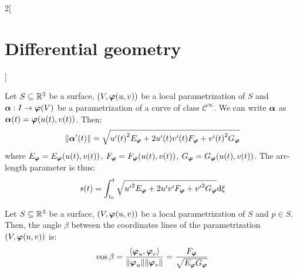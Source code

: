\documentclass[../../../main.tex]{subfiles}
\begin{document}
\begin{multicols}{2}[\section{Differential geometry}]
  \begin{proposition}
    Let $S\subseteq\mathbb{R}^3$ be a surface, $(V,\boldsymbol{\mathrm{\varphi}}(u,v))$ be a local parametrization of $S$ and $\boldsymbol{\mathrm{\alpha}}:I\rightarrow\boldsymbol{\mathrm{\varphi}}(V)$ be a parametrization of a curve of class $\mathcal{C}^\infty$. We can write $\boldsymbol{\mathrm{\alpha}}$ as $\boldsymbol{\mathrm{\alpha}}(t)=\boldsymbol{\mathrm{\varphi}}(u(t),v(t))$. Then:
    $$\|\boldsymbol{\mathrm{\alpha}}'(t)\|=\sqrt{{u'(t)}^2 E_{\boldsymbol{\mathrm{\varphi}}}+2u'(t)v'(t) F_{\boldsymbol{\mathrm{\varphi}}}+{v'(t)}^2G_{\boldsymbol{\mathrm{\varphi}}}}$$ where $E_{\boldsymbol{\mathrm{\varphi}}}=E_{\boldsymbol{\mathrm{\varphi}}}(u(t),v(t))$, $F_{\boldsymbol{\mathrm{\varphi}}}=F_{\boldsymbol{\mathrm{\varphi}}}(u(t),v(t))$, $G_{\boldsymbol{\mathrm{\varphi}}}=G_{\boldsymbol{\mathrm{\varphi}}}(u(t),v(t))$. The arc-length parameter is thus:
    $$s(t)=\int_{t_0}^t\sqrt{{u'}^2 E_{\boldsymbol{\mathrm{\varphi}}}+2u'v' F_{\boldsymbol{\mathrm{\varphi}}}+{v'}^2G_{\boldsymbol{\mathrm{\varphi}}}}\dd \xi$$
  \end{proposition}
  \begin{proposition}
    Let $S\subseteq\mathbb{R}^3$ be a surface, $(V,\boldsymbol{\mathrm{\varphi}}(u,v))$ be a local parametrization of $S$ and $p\in S$. Then, the angle $\beta$ between the coordinates lines of the parametrization $(V,\boldsymbol{\mathrm{\varphi}}(u,v))$ is: $$\cos\beta=\frac{\langle\boldsymbol{\mathrm{\varphi}}_u,\boldsymbol{\mathrm{\varphi}}_v\rangle}{\|\boldsymbol{\mathrm{\varphi}}_u\|\|\boldsymbol{\mathrm{\varphi}}_v\|}=\frac{F_{\boldsymbol{\mathrm{\varphi}}}}{\sqrt{E_{\boldsymbol{\mathrm{\varphi}}}G_{\boldsymbol{\mathrm{\varphi}}}}}$$
  \end{proposition}

\end{multicols}
\end{document}
